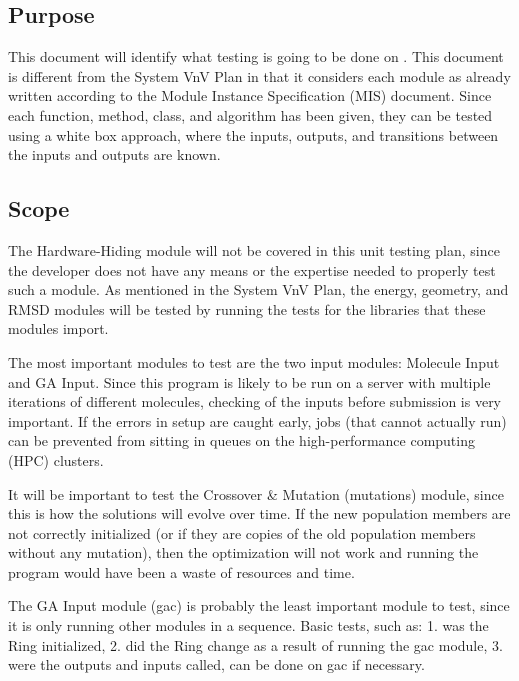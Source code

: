 \documentclass[12pt, titlepage]{article}
\begin{document}
\subsection{Purpose}

This document will identify what testing is going to be done on \progname{}. 
This document is different from the System VnV Plan in that it considers each 
module as already written according to the Module Instance Specification (MIS) 
document. Since each function, method, class, and algorithm has been given, 
they can be tested using a white box approach, where the inputs, outputs, and 
transitions between the inputs and outputs are known.


\subsection{Scope}

The Hardware-Hiding module will not be covered in this unit testing plan, since 
the developer does not have any means or the expertise needed to properly test 
such a module. As mentioned in the System VnV Plan, the energy, geometry, and 
RMSD modules will be tested by running the tests for the libraries that these 
modules import.

The most important modules to test are the two input modules: Molecule Input 
and GA Input. Since this program is likely to be run on a server with multiple 
iterations of different molecules, checking of the inputs before submission is 
very important. If the errors in setup are caught early, jobs (that cannot 
actually run) can be prevented from sitting in queues on the high-performance 
computing (HPC) clusters.

It will be important to test the Crossover \& Mutation (mutations) module, 
since this is how the solutions will evolve over time. If the new population 
members are not correctly initialized (or if they are copies of the old 
population members without any mutation), then the optimization will not work 
and running the program would have been a waste of resources and time.

The GA Input module (gac) is probably the least important module to test, since 
it is only running other modules in a sequence. Basic tests, such as: 1. was 
the Ring initialized, 2. did the Ring change as a result of running the gac 
module, 3. were the outputs and inputs called, can be done on gac if necessary.
\end{document}

